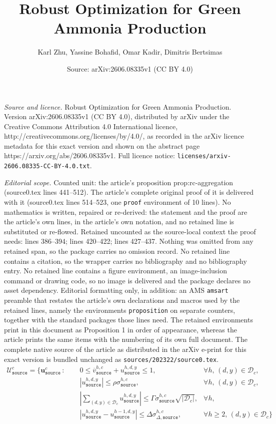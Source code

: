 \documentclass[10pt,a4paper]{amsart}
\title{Robust Optimization for Green Ammonia Production}
\author{Karl Zhu, Yassine Bohafid, Omar Kadir, Dimitris Bertsimas}
\date{Source: arXiv:2606.08335v1 (CC BY 4.0)}
\begin{document}
\maketitle

\noindent\emph{Source and licence.} Robust Optimization for Green Ammonia Production. Version arXiv:2606.08335v1 (CC BY 4.0), distributed by arXiv under the Creative Commons Attribution 4.0 International licence, http://creativecommons.org/licenses/by/4.0/, as recorded in the arXiv licence metadata for this exact version and shown on the abstract page https://arxiv.org/abs/2606.08335v1. Full licence notice: \texttt{licenses/arxiv-2606.08335-CC-BY-4.0.txt}.\par\smallskip

\noindent\textit{Editorial scope.} Counted unit: the article's proposition prop:rc-aggregation (source0.tex lines 441--512). The article's complete original proof of it is delivered with it (source0.tex lines 514--523, one \texttt{proof} environment of 10 lines). No mathematics is written, repaired or re-derived: the statement and the proof are the article's own lines, in the article's own notation, and no retained line is substituted or re-flowed.  Retained uncounted as the source-local context the proof needs: lines 386--394; lines 420--422; lines 427--437.  Nothing was omitted from any retained span, so the package carries no omission record.  No retained line contains a citation, so the wrapper carries no bibliography and no bibliography entry.  No retained line contains a figure environment, an image-inclusion command or drawing code, so no image is delivered and the package declares no asset dependency.  Editorial formatting only, in addition: an AMS \texttt{amsart} preamble that restates the article's own declarations and macros used by the retained lines, namely the environments \texttt{proposition} on separate counters, together with the standard packages those lines need.  The retained environments print in this document as Proposition 1 in order of appearance, whereas the article prints the same items with the numbering of its own full document.  The complete native source of the article as distributed in the arXiv e-print for this exact version is bundled unchanged as \texttt{sources/202322/source0.tex}.
\begin{align}
\mathcal{U}^{c}_{\texttt{source}} = \Big\{ \boldsymbol{u}^c_\texttt{source} \,:\;
    & \quad 0 \le \overline{v}^{h,c}_{\texttt{source}} + u^{h,d,y}_{\texttt{source}} \le 1, & \forall h ,\,(d,y) \in \mathcal{D}_c,
    \label{eq:clt-capacity-bound} \\
    & \quad \left|u^{h,d,y}_{\texttt{source}}\right| \le \rho \sigma^{h,c}_{\texttt{source}},  &\forall h ,\,(d,y) \in \mathcal{D}_c,
    \label{eq:clt-hourly-box} \\
    & \quad \left| \sum_{(d,y) \in \mathcal{D}_c} u^{h,d,y}_{\texttt{source}} \right| \le \Gamma \sigma^{h,c}_{\texttt{source}} \sqrt{|\mathcal{D}_c|}, & \forall h,
        & \label{eq:clt-clt} \\ & \quad \left| u^{h,d,y}_{\texttt{source}} - u^{h-1,d,y}_{\texttt{source}} \right| \le \Delta \sigma^{h,c}_{\Delta,\texttt{source}}, &\forall h \ge 2,\,(d,y) \in \mathcal{D}_c\label{eq:clt-smooth}  \Big\}
\end{align}
\end{document}
